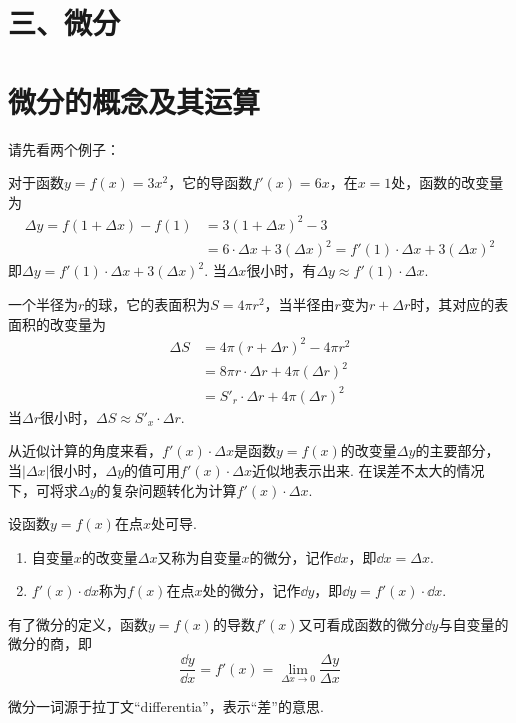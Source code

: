 \section*{三、微分}

\section{微分的概念及其运算}
请先看两个例子：

对于函数$y=f(x)=3x^2$，它的导函数$f'(x)=6x$，在$x=1$处，函数的改变量为
\[\begin{split}
   \Delta y=f(1+\Delta x)-f(1)
&=3(1+\Delta x)^2-3\\
&=6\cdot \Delta x+3(\Delta x)^2=f'(1)\cdot \Delta x+3(\Delta x)^2 
\end{split}\]
即$\Delta y=f'(1)\cdot \Delta x+3(\Delta x)^2$. 当$\Delta x$很小时，有$\Delta y\approx f'(1)\cdot \Delta x$.

一个半径为$r$的球，它的表面积为$S=4\pi r^2$，当半径由$r$变为$r+\Delta r$时，其对应的表面积的改变量为
\[\begin{split}
\Delta S&=4\pi (r+\Delta r)^2-4\pi r^2\\
&=8\pi r\cdot \Delta r+4\pi (\Delta r)^2\\
&=S'_r\cdot \Delta r+4\pi (\Delta r)^2    
\end{split}\]
当$\Delta r$很小时，$\Delta S\approx S'_x\cdot \Delta r$.

从近似计算的角度来看，$f'(x)\cdot \Delta x$是函数$y=f(x)$的改变量$\Delta y$的主要部分，当$|\Delta x|$很小时，$\Delta y$的值可用$f'(x)\cdot \Delta x$近似地表示出来. 在误差不太大的情况下，可将求$\Delta y$的复杂问题转化为计算$f'(x)\cdot \Delta x$.

设函数$y=f(x)$在点$x$处可导.
\begin{enumerate}
    \item 自变量$x$的改变量$\Delta x$又称为自变量$x$的微分，记作$\dd x$，即$\dd x=\Delta x$.
    \item $f'(x)\cdot \dd x$称为$f(x)$在点$x$处的微分，记作$\dd y$，即$\dd y=f'(x)\cdot \dd x$.
\end{enumerate}

    有了微分的定义，函数$y=f(x)$的导数$f'(x)$又可看成函数的微分$\dd y$与自变量的微分的商，即
\[\frac{\dd y}{\dd x}=f'(x)=\lim_{\Delta x\to 0}\frac{\Delta y}{\Delta x}\]

\begin{rmk}
    微分一词源于拉丁文“differentia”，表示“差”的意思.
\end{rmk}


